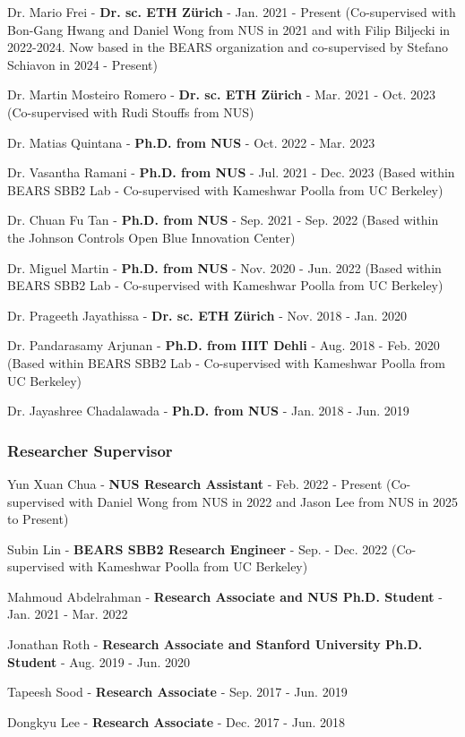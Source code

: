 \documentclass[10pt,a4paper]{article}
\begin{document}
\begin{small}
\begin{etaremune}
\item 
Dr. Mario Frei - \textbf{Dr. sc. ETH Z\"urich} - Jan. 2021 - Present (Co-supervised with Bon-Gang Hwang and Daniel Wong from NUS in 2021 and with Filip Biljecki in 2022-2024. Now based in the BEARS organization and co-supervised by Stefano Schiavon in 2024 - Present)
\item 
Dr. Martin Mosteiro Romero - \textbf{Dr. sc. ETH Z\"urich} - Mar. 2021 - Oct. 2023 (Co-supervised with Rudi Stouffs from NUS)
\item
Dr. Matias Quintana - \textbf{Ph.D. from NUS} - Oct. 2022 - Mar. 2023 
\item
Dr. Vasantha Ramani - \textbf{Ph.D. from NUS} - Jul. 2021 - Dec. 2023 (Based within BEARS SBB2 Lab - Co-supervised with Kameshwar Poolla from UC Berkeley)
\item
Dr. Chuan Fu Tan - \textbf{Ph.D. from NUS} - Sep. 2021 - Sep. 2022 (Based within the Johnson Controls Open Blue Innovation Center)
\item  
Dr. Miguel Martin - \textbf{Ph.D. from NUS} - Nov. 2020 - Jun. 2022 (Based within BEARS SBB2 Lab - Co-supervised with Kameshwar Poolla from UC Berkeley)
\item 
Dr. Prageeth Jayathissa - \textbf{Dr. sc. ETH Z\"urich} - Nov. 2018 - Jan. 2020
\item
Dr. Pandarasamy Arjunan - \textbf{Ph.D. from IIIT Dehli} - Aug. 2018 - Feb. 2020 (Based within BEARS SBB2 Lab - Co-supervised with Kameshwar Poolla from UC Berkeley)
\item 
Dr. Jayashree Chadalawada - \textbf{Ph.D. from NUS} - Jan. 2018 - Jun. 2019 
\end{etaremune}

\subsubsection*{Researcher Supervisor}
\begin{etaremune}
\item
Yun Xuan Chua - \textbf{NUS Research Assistant} - Feb. 2022 - Present (Co-supervised with Daniel Wong from NUS in 2022 and Jason Lee from NUS in 2025 to Present)
\item
Subin Lin - \textbf{BEARS SBB2 Research Engineer} - Sep. - Dec. 2022 (Co-supervised with Kameshwar Poolla from UC Berkeley)
\item 
Mahmoud Abdelrahman - \textbf{Research Associate and NUS Ph.D. Student} - Jan. 2021  - Mar. 2022
\item 
Jonathan Roth - \textbf{Research Associate and Stanford University Ph.D. Student} - Aug. 2019  - Jun. 2020
\item 
Tapeesh Sood - \textbf{Research Associate} - Sep. 2017 - Jun. 2019
\item 
Dongkyu Lee - \textbf{Research Associate} - Dec. 2017 - Jun. 2018
\end{etaremune}


\end{small}
\end{document}
